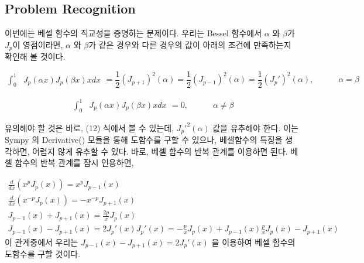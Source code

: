\documentclass[11pt]{article}
\begin{document}
\subsection{Problem Recognition} 
 이번에는 베셀 함수의 직교성을 증명하는 문제이다.
우리는 Bessel 함수에서  $\alpha$ 와 $\beta$가 $J_p$이 영점이라면, $\alpha$ 와 $\beta$가 같은 경우와 다른 경우의 값이 아래의 조건에 만족하는지 확인해 볼 것이다. 

\begin{equation}
\begin{split}
    \int_0^1 &J_p(\alpha x) J_p(\beta x) x dx
    \end{split}   
    = \frac{1}{2} (J_{p + 1})^2(\alpha) = \frac{1}{2} (J_{p - 1})^2(\alpha) = \frac{1}{2} (J_p')^2(\alpha)
   		  , \quad \quad\quad\alpha = \beta
        \end{equation}

\begin{equation}
\begin{split}
    \int_0^1 &J_p(\alpha x) J_p(\beta x) x dx
    \end{split}   
    =  0
   		  , \quad \quad\quad\alpha \neq \beta
        \end{equation}

유의해야 할 것은 바로, (12) 식에서 볼 수 있는데, $J_p'^2(\alpha)$ 값을 유추해야 한다. 이는 Sympy 의 Derivative() 모듈을 통해 도함수를 구할 수 있으나, 베셀함수의 특징을 생각하면, 어렵지 않게 유추할 수 있다. 바로, 베셀 함수의 반복 관계를 이용하면 된다. 베셀 함수의 반복 관계를 잠시 인용하면,

\begin{equation}
\begin{array}{c}

\displaystyle
\frac{d}{dx} (x^p J_p(x))
=
x^p J_{p - 1}(x)
\\

\displaystyle
\frac{d}{dx} (x^{-p} J_p(x))
=
-x^{-p} J_{p + 1}(x)
\\

\displaystyle
J_{p - 1}(x) + J_{p + 1}(x)
=
\frac{2p}{x} J_p(x)
\\

\displaystyle
J_{p - 1}(x) - J_{p + 1}(x)
=
2 J_p'(x)


\displaystyle
J_p'(x)
=
-\frac{p}{x} J_p(x) + J_{p - 1}(x)

\frac{p}{x} J_p(x) - J_{p + 1}(x)
\end{array}
        \end{equation}
        이 관계중에서 우리는 $J_{p - 1}(x) - J_{p + 1}(x)=2 J_p'(x)$ 을 이용하여 베셀 함수의 도함수를 구할 것이다.
        
\end{document}
